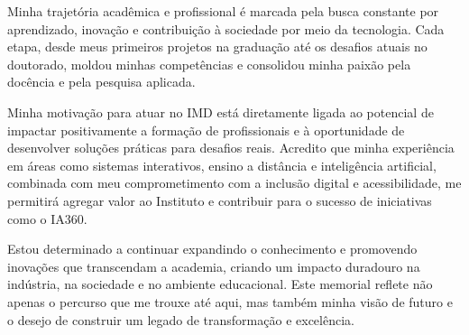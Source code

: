 \documentclass[10pt,a4paper,oneside]{book}
\begin{document}
Minha trajetória acadêmica e profissional é marcada pela busca constante por aprendizado, inovação e contribuição à
sociedade por meio da tecnologia. Cada etapa, desde meus primeiros projetos na graduação até os desafios atuais no
doutorado, moldou minhas competências e consolidou minha paixão pela docência e pela pesquisa aplicada.

Minha motivação para atuar no IMD está diretamente ligada ao potencial de impactar positivamente a formação de
profissionais e à oportunidade de desenvolver soluções práticas para desafios reais. Acredito que minha experiência
em áreas como sistemas interativos, ensino a distância e inteligência artificial, combinada com meu comprometimento
com a inclusão digital e acessibilidade, me permitirá agregar valor ao Instituto e contribuir para o sucesso de
iniciativas como o IA360.

Estou determinado a continuar expandindo o conhecimento e promovendo inovações que transcendam a academia, criando um
impacto duradouro na indústria, na sociedade e no ambiente educacional. Este memorial reflete não apenas o percurso
que me trouxe até aqui, mas também minha visão de futuro e o desejo de construir um legado de transformação e excelência.



\backmatter


\end{document}
